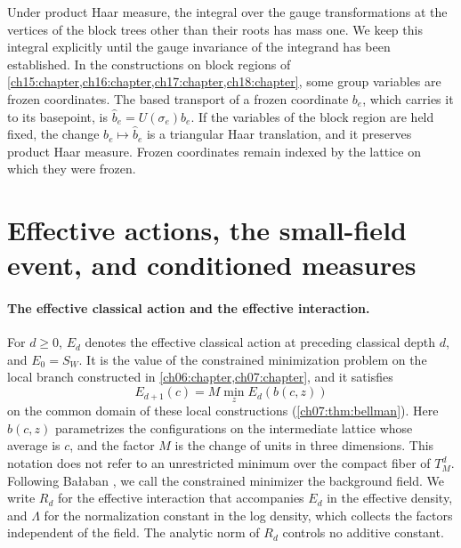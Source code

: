 Under product Haar measure, the integral over the gauge transformations at the vertices of the block trees other than their roots has mass one. We keep this integral explicitly until the gauge invariance of the integrand has been established. In the constructions on block regions of \cref{ch15:chapter,ch16:chapter,ch17:chapter,ch18:chapter}, some group variables are frozen coordinates. The based transport of a frozen coordinate $b_e$, which carries it to its basepoint, is $\widehat b_e=U(\sigma_e)b_e$. If the variables of the block region are held fixed, the change $b_e\mapsto\widehat b_e$ is a triangular Haar translation, and it preserves product Haar measure. Frozen coordinates remain indexed by the lattice on which they were frozen.

\section{Effective actions, the small-field event, and conditioned measures}\label{ch01:sec:measures}

\paragraph{The effective classical action and the effective interaction.}
For $d\ge0$, $E_d$ denotes the effective classical action at preceding classical depth $d$, and $E_0=S_W$. It is the value of the constrained minimization problem on the local branch constructed in \cref{ch06:chapter,ch07:chapter}, and it satisfies
\[
 E_{d+1}(c)=M\min_zE_d(b(c,z))
\]
on the common domain of these local constructions (\cref{ch07:thm:bellman}). Here $b(c,z)$ parametrizes the configurations on the intermediate lattice whose average is $c$, and the factor $M$ is the change of units in three dimensions. This notation does not refer to an unrestricted minimum over the compact fiber of $T_M^d$. Following Bałaban \cite{Balaban1985Variational}, we call the constrained minimizer the background field. We write $R_d$ for the effective interaction that accompanies $E_d$ in the effective density, and $\Lambda$ for the normalization constant in the log density, which collects the factors independent of the field. The analytic norm of $R_d$ controls no additive constant.

